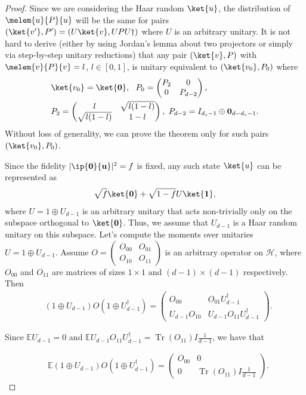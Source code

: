 \documentclass[pra,twocolumn,superscriptaddress,longbibliography]{revtex4-2}
\theoremstyle{remark}
\newcommand{\mcl}{\mathcal}
\newcommand{\mbb}{\mathbb}
\newcommand{\bmp}{\begin{pmatrix}}
\newcommand{\emp}{\end{pmatrix}}
\DeclareMathOperator{\tr}{Tr}
\numberwithin{equation}{section}
\begin{document}
\begin{proof}
Since we are considering the Haar random $\ket{u}$, the distribution of $\melem{u}{P}{u}$ will be the same for pairs 
$(\ket{v'}, P') = (U\ket{v}, UPU\dagger)$ where $U$ is an arbitrary unitary. 
It is not hard to derive (either by using Jordan's lemma about two projectors or simply via step-by-step unitary reductions) 
that any pair $(\ket{v}, P)$ with $\melem{v}{P}{v}=l$, $l \in [0,1]$, 
is unitary equivalent to $(\ket{v_0}, P_0)$ where  
\begin{align*}
& \ket{v_0} = \ket{\bf 0}, ~~P_0 = \bmp P_{2} & 0 \\ 0 & P_{d-2} \emp, \\
& P_{2} = \bmp l & \sqrt{l(1-l)} \\ \sqrt{l(1-l)} & 1-l\emp, ~P_{d-2} = I_{d_s-1} \oplus {\bf 0}_{d-d_s-1}.\\ 
\end{align*}
Without loss of generality, we can prove the theorem only for such pairs $(\ket{v_0}, P_0)$.

Since the fidelity $|\ip{\bf 0}{u}|^2 = f$ is fixed, any such state $\ket{u}$ can be represented as 
$$
\sqrt{f}\ket{\bf 0} + \sqrt{1-f}U\ket{\bf 1},
$$
where %
$U = 1 \oplus U_{d-1}$ is an arbitrary unitary that acts non-trivially only on the subspace orthogonal to $\ket{\bf 0}$.
Thus, we assume that $U_{d-1}$ is a Haar random unitary on this subspace. 
Let's compute the moments over unitaries $U = 1 \oplus U_{d-1}$. 
Assume $O = \bmp O_{00} & O_{01} \\ O_{10} & O_{11} \emp$ is an arbitrary operator on $\mcl{H}$, 
where $O_{00}$ and $O_{11}$ are matrices of sizes $1\times1$ and $(d-1)\times (d-1)$ respectively. 
Then 
\begin{align*}
    & (1 \oplus U_{d-1}) O (1 \oplus U_{d-1}^\dagger) 
    = \bmp O_{00} & O_{01} U_{d-1}^\dagger \\ U_{d-1} O_{10} & U_{d-1} O_{11} U_{d-1}^\dagger \emp. 
\end{align*}

Since ${\mbb{E}} U_{d-1} = 0$ and ${\mbb{E}}U_{d-1} O_{11} U_{d-1}^\dagger = \tr(O_{11})I\frac{1}{d-1}$, we have that 

\begin{align*}
    & {\mbb{E}}(1 \oplus U_{d-1}) O (1 \oplus U_{d-1}^\dagger) 
    = \bmp O_{00} & 0 \\ 0 & \tr(O_{11})I\frac{1}{d-1} \emp. 
\end{align*}


\end{proof}
\end{document}
